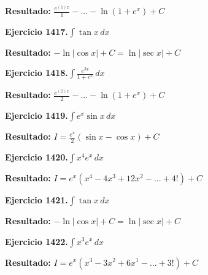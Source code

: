 \documentclass[10pt,a4paper]{article}
\begin{document}
\begin{solbox}
\textbf{Resultado:} \(\displaystyle \frac{e^{(1)x}}{1} - ... - \ln(1+e^x) + C\)
\end{solbox}

\newpage
\begin{ejbox}
\textbf{Ejercicio 1417.}\quad $\int \tan x\,dx$
\end{ejbox}

\begin{solbox}
\textbf{Resultado:} \(\displaystyle -\ln|\cos x| + C = \ln|\sec x| + C\)
\end{solbox}

\begin{ejbox}
\textbf{Ejercicio 1418.}\quad $\int \frac{e^{3x}}{1+e^{x}}\,dx$
\end{ejbox}

\begin{solbox}
\textbf{Resultado:} \(\displaystyle \frac{e^{(2)x}}{2} - ... - \ln(1+e^x) + C\)
\end{solbox}

\begin{ejbox}
\textbf{Ejercicio 1419.}\quad $\int e^x\sin x\,dx$
\end{ejbox}

\begin{solbox}
\textbf{Resultado:} \(\displaystyle I = \frac{e^x}{2}(\sin x - \cos x) + C\)
\end{solbox}

\newpage
\begin{ejbox}
\textbf{Ejercicio 1420.}\quad $\int x^{4} e^x\,dx$
\end{ejbox}

\begin{solbox}
\textbf{Resultado:} \(\displaystyle I = e^x(x^{4} - 4x^{3} + 12x^{2} - ... + 4!) + C\)
\end{solbox}

\begin{ejbox}
\textbf{Ejercicio 1421.}\quad $\int \tan x\,dx$
\end{ejbox}

\begin{solbox}
\textbf{Resultado:} \(\displaystyle -\ln|\cos x| + C = \ln|\sec x| + C\)
\end{solbox}

\begin{ejbox}
\textbf{Ejercicio 1422.}\quad $\int x^{3} e^x\,dx$
\end{ejbox}

\begin{solbox}
\textbf{Resultado:} \(\displaystyle I = e^x(x^{3} - 3x^{2} + 6x^{1} - ... + 3!) + C\)
\end{solbox}
\end{document}
